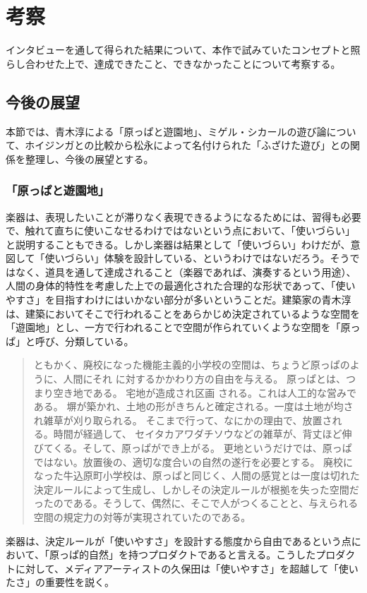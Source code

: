 \chapter{考察}
インタビューを通して得られた結果について、本作で試みていたコンセプトと照らし合わせた上で、達成できたこと、できなかったことについて考察する。

\section{今後の展望}
本節では、青木淳による「原っぱと遊園地」、ミゲル・シカールの遊び論について、ホイジンガとの比較から松永によって名付けられた「ふざけた遊び」との関係を整理し、今後の展望とする。

\subsection{「原っぱと遊園地」}
楽器は、表現したいことが滞りなく表現できるようになるためには、習得も必要で、触れて直ちに使いこなせるわけではないという点において、「使いづらい」と説明することもできる。しかし楽器は結果として「使いづらい」わけだが、意図して「使いづらい」体験を設計している、というわけではないだろう。そうではなく、道具を通して達成されること（楽器であれば、演奏するという用途）、人間の身体的特性を考慮した上での最適化された合理的な形状であって、「使いやすさ」を目指すわけにはいかない部分が多いということだ。建築家の青木淳は、建築においてそこで行われることをあらかじめ決定されているような空間を「遊園地」とし、一方で行われることで空間が作られていくような空間を「原っぱ」と呼び、分類している。

\begin{quote}
  ともかく、廃校になった機能主義的小学校の空間は、ちょうど原っぱのように、人間にそれ に対するかかわり方の自由を与える。 原っぱとは、つまり空き地である。 宅地が造成され区画 される。これは人工的な営みである。 塀が築かれ、土地の形がきちんと確定される。一度は土地が均され雑草が刈り取られる。 そこまで行って、なにかの理由で、放置される。時間が経過して、 セイタカアワダチソウなどの雑草が、背丈ほど伸びてくる。そして、原っぱができ上がる。 更地というだけでは、原っぱではない。放置後の、適切な度合いの自然の遂行を必要とする。 
  廃校になった牛込原町小学校は、原っぱと同じく、人間の感覚とは一度は切れた決定ルールによって生成し、しかしその決定ルールが根拠を失った空間だったのである。そうして、偶然に、そこで人がつくることと、与えられる空間の規定力の対等が実現されていたのである。  
\end{quote}


楽器は、決定ルールが「使いやすさ」を設計する態度から自由であるという点において、「原っぱ的自然」を持つプロダクトであると言える。こうしたプロダクトに対して、メディアアーティストの久保田は「使いやすさ」を超越して「使いたさ」の重要性を説く。

